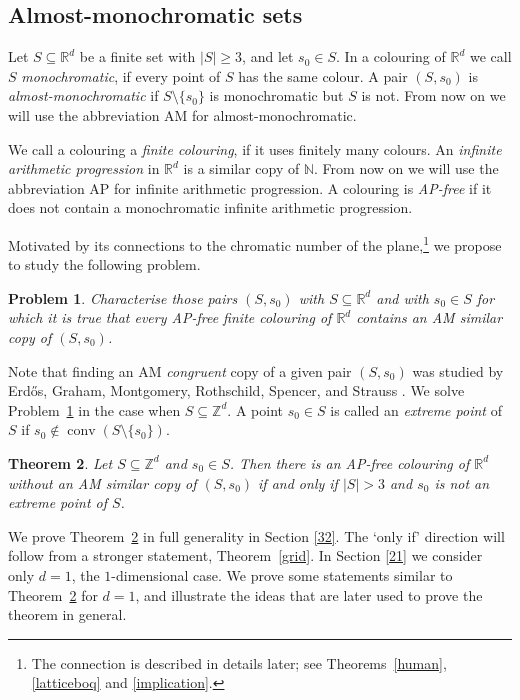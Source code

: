 \documentclass[12pt]{article}
\DeclareMathOperator{\conv}{conv}
\theoremstyle{plain}
\newtheorem{theorem}{Theorem}
\newtheorem{problem}[theorem]{Problem}
\theoremstyle{definition}
\begin{document}
\subsection{Almost-monochromatic sets}

Let $S\subseteq \mathbb{R}^d$ be a finite set with $|S|\geq 3$, and let $s_0\in S$. In a colouring of $\mathbb{R}^d$ we call $S$ \emph{monochromatic}, if every point of $S$ has the same colour. A pair $(S,s_0)$ is \emph{almost-monochromatic} if $S\setminus \{s_0\}$ is monochromatic but $S$ is not. 
From now on we will use the abbreviation AM for almost-monochromatic.

We call a colouring a \emph{finite colouring}, if it uses finitely many colours. An \emph{infinite arithmetic progression} in $\mathbb{R}^d$ is a similar copy of $\mathbb{N}$.
From now on we will use the abbreviation AP for infinite arithmetic progression.
A colouring is \emph{AP-free} if it does not contain a monochromatic infinite arithmetic progression.

Motivated by its connections to the chromatic number of the plane,\footnote{The connection is described in details later; see Theorems~\ref{human}, \ref{latticeboq} and \ref{implication}.} we propose to study the following problem.

\begin{problem}\label{problem1} Characterise those pairs $(S,s_0)$ with $S\subseteq \mathbb{R}^d$ and with $s_0\in S$ for which it is true that every AP-free finite colouring of $\mathbb{R}^d$ contains an AM similar copy of $(S,s_0)$.
\end{problem}

Note that finding an AM \emph{congruent} copy of a given pair $(S,s_0)$ was studied by Erd\H os, Graham, Montgomery, Rothschild, Spencer, and Strauss \cite{EGMRSS3}. We solve Problem~\ref{problem1} in the case when $S\subseteq \mathbb{Z}^d$. A point $s_0\in S$ is called an \emph{extreme point} of $S$ if $s_0\notin \conv (S\setminus \{s_0\})$. 

\begin{theorem}\label{introZ}
Let $S\subseteq \mathbb{Z}^d$ and $s_0\in S$. Then there is an AP-free colouring of $\mathbb{R}^d$ without an AM similar copy of $(S,s_0)$ if and only if $|S|>3$ and $s_0$ is not an extreme point of $S$.
\end{theorem}

We prove Theorem~\ref{introZ} in full generality in Section \ref{32}. The ‘only if’ direction will follow from a stronger statement, Theorem~\ref{grid}. In Section \ref{21} we consider only $d=1$, the $1$-dimensional case. We prove some statements similar to Theorem~\ref{introZ} for $d=1$, and illustrate the ideas that are later used to prove the theorem in general.
\end{document}
